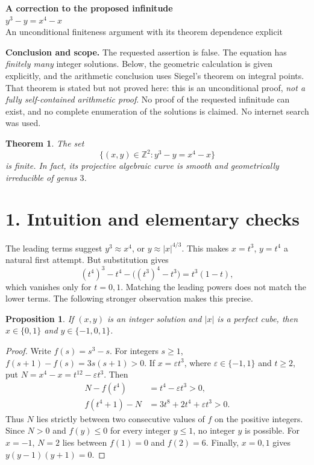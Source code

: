\documentclass[11pt,a4paper]{article}
\newtheorem{theorem}{Theorem}
\newtheorem{proposition}{Proposition}
\newcommand{\Z}{\mathbb Z}
\begin{document}
\thispagestyle{empty}
\begin{center}
{\Large\bfseries\color{ink}A correction to the proposed infinitude}\\[7pt]
{\LARGE $y^3-y=x^4-x$}\\[8pt]
{\small An unconditional finiteness argument with its theorem dependence explicit}
\end{center}

\textbf{Conclusion and scope.}
The requested assertion is false. The equation has \emph{finitely many}
integer solutions. Below, the geometric calculation is given explicitly,
and the arithmetic conclusion uses Siegel's theorem on integral points.
That theorem is stated but not proved here: this is an unconditional proof,
\emph{not a fully self-contained arithmetic proof}. No proof of the requested
infinitude can exist, and no complete enumeration of the solutions is claimed.
No internet search was used.

\begin{theorem}\label{thm:main}
The set
\[
\{(x,y)\in\Z^2:y^3-y=x^4-x\}
\]
is finite. In fact, its projective algebraic curve is smooth and
geometrically irreducible of genus $3$.
\end{theorem}

\section*{1. Intuition and elementary checks}
The leading terms suggest $y^3\approx x^4$, or $y\approx |x|^{4/3}$.
This makes $x=t^3$, $y=t^4$ a natural first attempt. But substitution gives
\[
(t^4)^3-t^4-\bigl((t^3)^4-t^3\bigr)=t^3(1-t),
\]
which vanishes only for $t=0,1$. Matching the leading powers does not
match the lower terms. The following stronger observation makes this precise.

\begin{proposition}\label{prop:cubes}
If $(x,y)$ is an integer solution and $|x|$ is a perfect cube, then
$x\in\{0,1\}$ and $y\in\{-1,0,1\}$.
\end{proposition}
\begin{proof}
Write $f(s)=s^3-s$. For integers $s\ge1$,
$f(s+1)-f(s)=3s(s+1)>0$.
If $x=\varepsilon t^3$, where $\varepsilon\in\{-1,1\}$ and $t\ge2$,
put $N=x^4-x=t^{12}-\varepsilon t^3$. Then
\begin{align*}
N-f(t^4)&=t^4-\varepsilon t^3>0,\\
f(t^4+1)-N&=3t^8+2t^4+\varepsilon t^3>0.
\end{align*}
Thus $N$ lies strictly between two consecutive values of $f$ on the
positive integers. Since $N>0$ and $f(y)\le0$ for every integer $y\le1$,
no integer $y$ is possible. For $x=-1$, $N=2$ lies between $f(1)=0$
and $f(2)=6$. Finally, $x=0,1$ gives $y(y-1)(y+1)=0$.
\end{proof}
\end{document}
